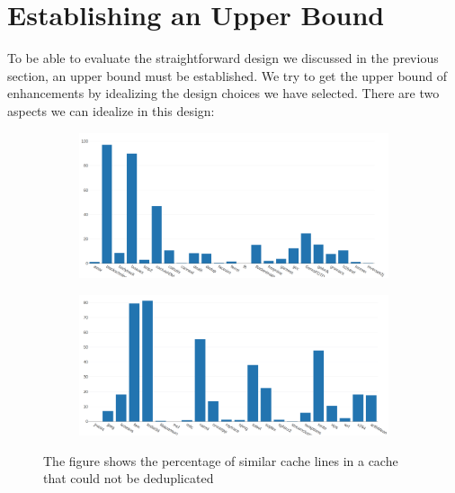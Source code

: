 \section{Establishing an Upper Bound}
\label{sec:Upper Bound}
To be able to evaluate the straightforward design we discussed in the previous section, an upper bound must be established. We try to get the upper bound of enhancements by idealizing the design choices we have selected. There are two aspects we can idealize in this design:
\begin{figure}
    \begin{subfigure}[t]{\textwidth}
        \includegraphics[width=\textwidth]{MissedDedup1.png}
    \end{subfigure}
    \begin{subfigure}[b]{\textwidth}
        \includegraphics[width=\textwidth]{MissedDedup2.png}
    \end{subfigure}
    \caption[Missed Dedup Opportunity]{The figure shows the percentage of similar cache lines in a cache that could not be deduplicated}
    \label{fig:MissedDedup}
\end{figure}
